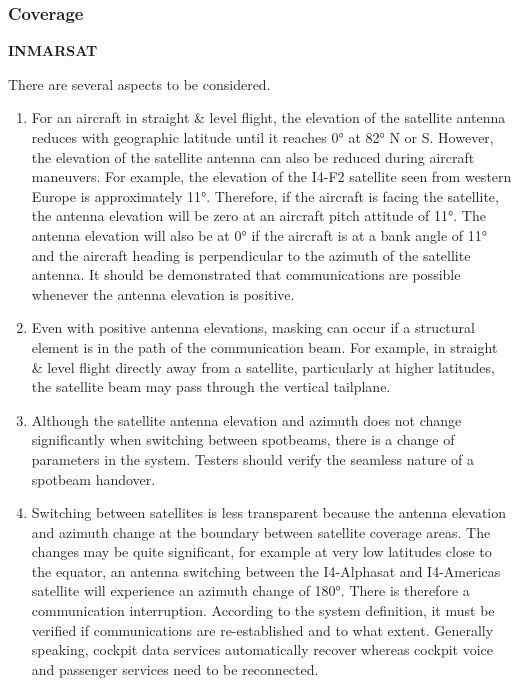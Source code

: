 \documentclass[
]{book}
\begin{document}
\hypertarget{coverage}{%
\subsubsection{Coverage}\label{coverage}}

\textbf{INMARSAT}

There are several aspects to be considered.

\begin{enumerate}
\def\labelenumi{\arabic{enumi}.}
\item
  For an aircraft in straight \& level flight, the elevation of the satellite
  antenna reduces with geographic latitude until it reaches 0° at 82° N or S.
  However, the elevation of the satellite antenna can also be reduced during
  aircraft maneuvers. For example, the elevation of the I4-F2 satellite seen from
  western Europe is approximately 11°. Therefore, if the aircraft is facing the
  satellite, the antenna elevation will be zero at an aircraft pitch attitude of
  11°. The antenna elevation will also be at 0° if the aircraft is at a bank
  angle of 11° and the aircraft heading is perpendicular to the azimuth of the
  satellite antenna. It should be demonstrated that communications are possible
  whenever the antenna elevation is positive.
\item
  Even with positive antenna elevations, masking can occur if a structural
  element is in the path of the communication beam. For example, in straight \&
  level flight directly away from a satellite, particularly at higher latitudes,
  the satellite beam may pass through the vertical tailplane.
\item
  Although the satellite antenna elevation and azimuth does not change
  significantly when switching between spotbeams, there is a change of parameters
  in the system. Testers should verify the seamless nature of a spotbeam
  handover.
\item
  Switching between satellites is less transparent because the antenna
  elevation and azimuth change at the boundary between satellite coverage areas.
  The changes may be quite significant, for example at very low latitudes close
  to the equator, an antenna switching between the I4-Alphasat and I4-Americas
  satellite will experience an azimuth change of 180°. There is therefore a
  communication interruption. According to the system definition, it must be
  verified if communications are re-established and to what extent. Generally
  speaking, cockpit data services automatically recover whereas cockpit voice and
  passenger services need to be reconnected.
\end{enumerate}
\end{document}
